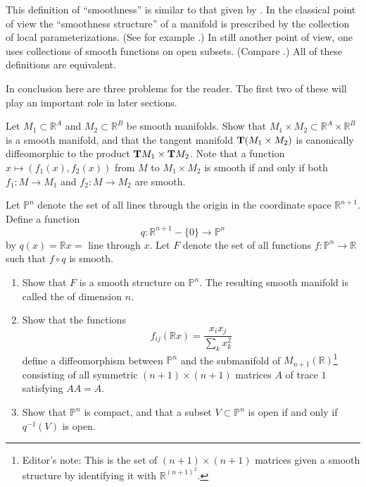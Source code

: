 \documentclass[../main]{subfiles}
\begin{document}
\begin{note}
This definition of ``smoothness'' is similar to that given by \cite{nomizu1956}. In the classical point of view the ``smoothness structure'' of a manifold is prescribed by the collection of local parameterizations. (See for example \cite[p.21]{steenrod1951}.) In still another point of view, one uses collections of smooth functions on open subsets. (Compare \cite{derham1955}.) All of these definitions are equivalent. 
\end{note}

In conclusion here are three problems for the reader. The first two of these will play an important role in later sections. 

\begin{problem}
\label{prob:1-A}
Let $M_1 \subset {\mathbb R}^A$ and $M_2 \subset {\mathbb R}^B$ be smooth manifolds. Show that $M_1 \times M_2 \subset {\mathbb R}^A \times {\mathbb R}^B$ is a smooth manifold, and that the tangent manifold $\mathbf{T}(M_1 \times M_2)$ is canonically diffeomorphic to the product $\mathbf{T}M_1 \times \mathbf{T}M_2$. Note that a function $x \mapsto (f_1(x), f_2(x))$ from $M$ to $M_1 \times M_2$ is smooth if and only if both $f_1 : M \longrightarrow M_1$ and $f_2 : M \longrightarrow M_2$ are smooth. 
\end{problem}

\begin{problem}
\label{prob:1-B}
Let ${\mathbb P}^n$ denote the set of all lines through the origin in the coordinate space ${\mathbb R}^{n + 1}$. Define a function \[q : {\mathbb R}^{n + 1} - \{0\} \longrightarrow {\mathbb P}^n\] by $q(x) = {\mathbb R} x =$ line through $x$. Let $F$ denote the set of all functions $f : {\mathbb P}^n \longrightarrow \mathbb R$ such that $f \circ q$ is smooth. 

\begin{enumerate}[label=\alph*)]
    \item Show that $F$ is a smooth structure on ${\mathbb P}^n$. The resulting smooth manifold is called the  of dimension $n$.
    \item Show that the functions \[f_{ij}(\mathbb R x) = \dfrac{x_i x_j}{\sum_k x_k^2}\] define a diffeomorphism between ${\mathbb P}^n$ and the submanifold of $M_{n+1}(\mathbb{R})$\footnote{Editor's note: This is the set of $(n+1)\times (n+1)$ matrices given a smooth structure by identifying it with $\mathbb{R}^{(n+1)^2}$.} consisting of all symmetric $(n + 1) \times (n + 1)$ matrices $A$ of trace $1$ satisfying $A A = A$.
    \item Show that ${\mathbb P}^n$ is compact, and that a subset $V \subset {\mathbb P}^n$ is open if and only if $q^{-1}(V)$ is open. 
\end{enumerate} 
\end{problem}
\end{document}
